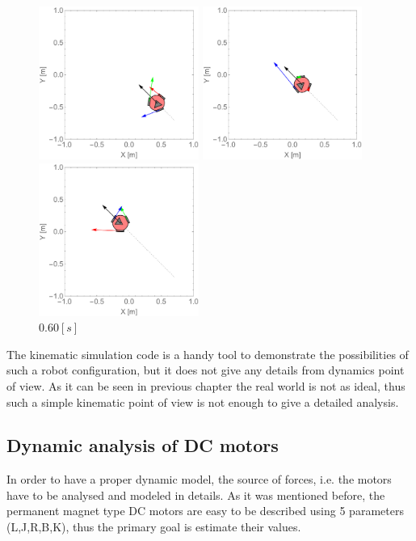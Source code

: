 \documentclass[12pt,english]{article}
\begin{document}
\begin{figure}[htb!]
	\centering
	\includegraphics[height=5cm]{figures/2d_simulation/animations/2D_move_along_line_and_rotating/20}
	\caption{$0.20[s]$}
	\endminipage\hfill
	\centering
	\includegraphics[height=5cm]{figures/2d_simulation/animations/2D_move_along_line_and_rotating/40}
	\caption{$0.40[s]$}
	\endminipage\hfill
	\centering
	\includegraphics[height=5cm]{figures/2d_simulation/animations/2D_move_along_line_and_rotating/60}
	\caption{$0.60[s]$}
	\endminipage\hfill
\end{figure}
The kinematic simulation code is a handy tool to demonstrate the possibilities of such a robot configuration, but it does not give any details from dynamics point of view. As it can be seen in previous chapter the real world is not as ideal, thus such a simple kinematic point of view is not enough to give a detailed analysis.
\newpage
\subsection{Dynamic analysis of DC motors}
In order to have a proper dynamic model, the source of forces, i.e. the motors have to be analysed and modeled in details. As it was mentioned before, the permanent magnet type DC motors are easy to be described using 5 parameters (L,J,R,B,K), thus the primary goal is estimate their values.
\end{document}
